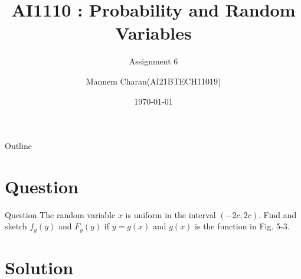 \documentclass{beamer}
\title{AI1110 : Probability and Random Variables}
\subtitle{Assignment 6}
\author{Mannem Charan(AI21BTECH11019)}
\date{\today}
\providecommand{\brak}[1]{\ensuremath{\left(#1\right)}}
\begin{document}
\begin{frame}
    \titlepage 
\end{frame}


\begin{frame}{Outline}
    \tableofcontents
\end{frame}


\section{Question}
\begin{frame}{Question}
 The random variable $x$ is uniform in the interval $\brak{-2c,2c}$. Find and sketch $f_{y}\brak{y}$ and $F_{y}\brak{y}$ if $y = g\brak{x}$ and $g\brak{x}$ is the function in Fig. 5-3.
\end{frame}

\section{Solution}
\end{document}

